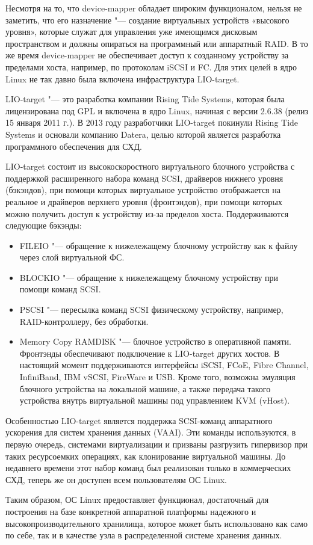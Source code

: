 \documentclass[10pt, a5paper]{article}
\begin{document}
Несмотря на то, что device-mapper обладает широким функционалом, нельзя не заметить, что его назначение "--- создание виртуальных устройств «высокого уровня», которые служат для управления уже имеющимся дисковым пространством и должны опираться на программный или аппаратный RAID. В то же время  device-mapper не обеспечивает доступ к созданному устройству за пределами хоста, например, по протоколам iSCSI и FC. Для этих целей в ядро Linux не так давно была включена инфраструктура LIO-target.

LIO-target "--- это разработка компании Rising Tide Systems, которая была лицензирована под  GPL и включена в ядро Linux, начиная с версии 2.6.38 (релиз 15 января 2011 г.). В 2013 году разработчики LIO-target покинули  Rising Tide Systems и основали компанию Datera, целью которой является разработка программного обеспечения для СХД.

LIO-target состоит из высокоскоростного виртуального блочного устройства с поддержкой расширенного набора команд SCSI, драйверов нижнего уровня (бэкэндов), при помощи которых виртуальное устройство отображается на реальное и драйверов верхнего уровня (фронтэндов), при помощи которых можно получить доступ к устройству из-за пределов хоста.
Поддерживаются следующие бэкэнды:

\begin{itemize}
  \item FILEIO "--- обращение к нижележащему блочному устройству как к файлу через слой виртуальной ФС.
  \item BLOCKIO "--- обращение к нижележащему блочному устройству при помощи команд SCSI.
  \item PSCSI "--- пересылка команд  SCSI физическому   устройству, например, RAID-контроллеру, без обработки.
  \item Memory Copy RAMDISK "--- блочное устройство в оперативной памяти.
Фронтэнды обеспечивают подключение к LIO-target других хостов. В настоящий момент поддерживаются интерфейсы iSCSI, FCoE, Fibre Channel, InfiniBand, IBM vSCSI, FireWare и USB. Кроме того, возможна эмуляция блочного устройства на локальной машине, а также передача такого устройства внутрь виртуальной машины под управлением \linebreak KVM (vHost).
\end{itemize}

Особенностью  LIO-target является поддержка SCSI-команд аппаратного ускорения для систем хранения данных (VAAI). Эти команды используются, в первую очередь, системами виртуализации и призваны разгрузить гипервизор при таких ресурсоемких операциях, как клонирование виртуальной машины. До недавнего времени этот набор команд был реализован только в коммерческих СХД, теперь же он доступен всем пользователям ОС Linux.

Таким образом, ОС Linux предоставляет функционал, достаточный для построения на базе конкретной аппаратной платформы надежного и высокопроизводительного хранилища, которое может быть использовано как само по себе, так и в качестве узла в распределенной системе хранения данных.
\end{document}
